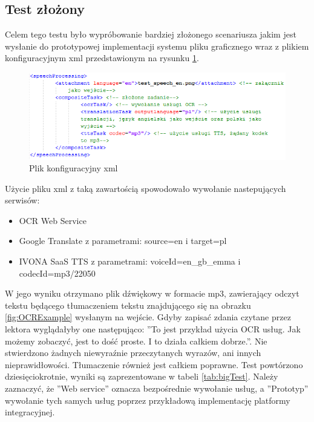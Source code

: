 \subsection{Test złożony}
Celem tego testu było wypróbowanie bardziej złożonego scenariusza jakim jest wysłanie do prototypowej implementacji systemu pliku graficznego wraz z plikiem konfiguracyjnym xml przedstawionym na rysunku \ref{fig:xmlConf}.

\begin{figure}[!h]
\centering
\includegraphics[scale=0.9]{xmlConf.png}
\caption{Plik konfiguracyjny xml}\label{fig:xmlConf}
\end{figure}
Użycie pliku xml z taką zawartością spowodowało wywołanie nastepujących serwisów:
\begin{itemize}
	\item OCR Web Service
	\item Google Translate z parametrami: source=en i target=pl
	\item IVONA SaaS TTS z parametrami: voiceId=en\_gb\_emma i codecId=mp3/22050
\end{itemize}
W jego wyniku otrzymano plik dźwiękowy w formacie mp3, zawierający odczyt tekstu będącego tłumaczeniem tekstu znajdującego się na obrazku \ref{fig:OCRExample} wysłanym na wejście. Gdyby zapisać zdania czytane przez lektora wyglądałyby one następująco: ''To jest przykład użycia OCR usług. Jak możemy zobaczyć, jest to dość proste. I to działa całkiem dobrze.''. Nie stwierdzono żadnych niewyraźnie przeczytanych wyrazów, ani innych nieprawidłowości. Tłumaczenie również jest całkiem poprawne. Test powtórzono dziesięciokrotnie, wyniki są zaprezentowane w tabeli \ref{tab:bigTest}. Należy zaznaczyć, że ''Web service'' oznacza bezpośrednie wywołanie usług, a ''Prototyp'' wywołanie tych samych usług poprzez przykładową implementację platformy integracyjnej.
\newpage

